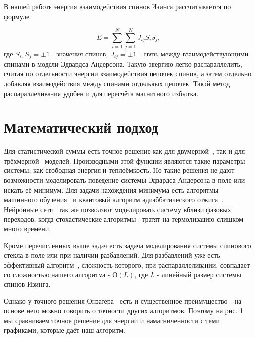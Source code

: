 \documentclass[utf8, babel, sor, jor, amsmath, amssymb, reprint]{elsarticle} %
\begin{document}
	В нашей работе энергия взаимодействия спинов Изинга рассчитывается по формуле

	\begin{equation}
		E = \sum\limits_{i=1}^N \sum\limits_{j=1}^N J_{ij} S_i S_j,
	\end{equation}
	где $S_i, S_j = \pm 1$ - значения спинов, $J_{ij} = \pm 1$ - связь между взаимодействующими спинами в модели Эдвардса-Андерсона. Такую энергию легко распараллелить, считая по отдельности энергии взаимодействия цепочек спинов, а затем отдельно добавляя взаимодействия между спинами отдельных цепочек. Такой метод распараллеливания удобен и для пересчёта магнитного избытка. 

	\section{Математический подход}

	Для статистической суммы есть точное решение как для двумерной~\cite{onsager1944crystal}, так и для трёхмерной~\cite{zhang2023exact} моделей. Производными этой функции являются такие параметры системы, как свободная энергия и теплоёмкость. Но такие решения не дают возможности моделировать поведение системы Эдвардса-Андерсона в поле или искать её минимум. Для задачи нахождения минимума есть алгоритмы машинного обучения~\cite{maren1991logical} и квантовый алгоритм адиаббатического отжига~\cite{grant2020adiabatic}. Нейронные сети~\cite{Korol2021} так же позволяют моделировать систему вблизи фазовых переходов, когда стохастические алгоритмы~\cite{janke2008monte} тратят на термолизацию слишком много времени.

	Кроме перечисленных выше задач есть задача моделирования системы спинового стекла в поле или при наличии разбавлений. Для разбавлений уже есть эффективный алгоритм~\cite{loh2006efficient}, сложность которого, при распараллеливании, совпадает со сложностью нашего алгоритма - $О(L)$, где $L$ - линейный размер системы спинов Изинга.

	Однако у точного решения Онзагера~\cite{onsager1944crystal} есть и существенное преимущество - на основе него можно говорить о точности других алгоритмов. Поэтому на рис. 1 мы сравниваем точное решение для энергии и намагниченности с теми графиками, которые даёт наш алгоритм.
\end{document}

